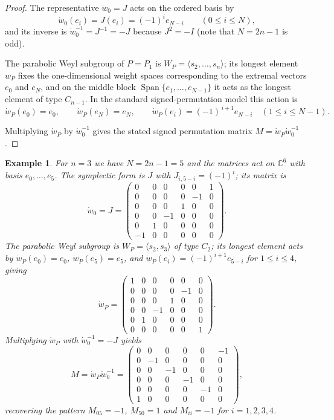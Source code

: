 \documentclass{article}
\newtheorem{exam}[thm]{Example}
\newcommand{\CC}{\mathbb{C}}
\begin{document}
\begin{proof}
The representative \(\dot w_0 = J\) acts on the ordered basis by
\[
\dot w_0(e_i)=J(e_i)=(-1)^i e_{N-i}\qquad(0\le i\le N),
\]
and its inverse is \(\dot w_0^{-1}=J^{-1}=-J\) because \(J^2=-I\) (note that \(N=2n-1\) is odd).

The parabolic Weyl subgroup of \(P=P_1\) is \(W_P=\langle s_2,\dots,s_n\rangle\); its longest element \(w_P\) fixes the one-dimensional weight spaces corresponding to the extremal vectors \(e_0\) and \(e_N\), and on the middle block \(\operatorname{Span}\{e_1,\dots,e_{N-1}\}\) it acts as the longest element of type \(C_{n-1}\).  In the standard signed-permutation model this action is
\[
\dot w_P(e_0)=e_0,\qquad
\dot w_P(e_N)=e_N,\qquad
\dot w_P(e_i)=(-1)^{\,i+1}e_{N-i}\quad(1\le i\le N-1).
\]

Multiplying \(\dot w_P\) by \(\dot w_0^{-1}\) gives the stated signed permutation matrix \(M=\dot w_P\dot w_0^{-1}\).
\end{proof}

\begin{exam}\label{ex:n3-matrices}
For \(n=3\) we have \(N=2n-1=5\) and the matrices act on \(\CC^6\) with basis \(e_0,\dots,e_5\).
The symplectic form is \(J\) with \(J_{i,5-i}=(-1)^i\); its matrix is
\[
\dot w_0 = J =
\begin{pmatrix}
 0& 0& 0& 0& 0& 1\\
 0& 0& 0& 0&-1& 0\\
 0& 0& 0& 1& 0& 0\\
 0& 0&-1& 0& 0& 0\\
 0& 1& 0& 0& 0& 0\\
-1& 0& 0& 0& 0& 0
\end{pmatrix}.
\]
The parabolic Weyl subgroup is \(W_P=\langle s_2,s_3\rangle\) of type \(C_2\); its longest element acts by \(\dot w_P(e_0)=e_0\), \(\dot w_P(e_5)=e_5\), and \(\dot w_P(e_i)=(-1)^{i+1}e_{5-i}\) for \(1\le i\le 4\), giving
\[
\dot w_P =
\begin{pmatrix}
1& 0& 0& 0& 0& 0\\
0& 0& 0& 0&-1& 0\\
0& 0& 0& 1& 0& 0\\
0& 0&-1& 0& 0& 0\\
0& 1& 0& 0& 0& 0\\
0& 0& 0& 0& 0& 1
\end{pmatrix}.
\]
Multiplying \(\dot w_P\) with \(\dot w_0^{-1}=-J\) yields
\[
M = \dot w_P\dot w_0^{-1} =
\begin{pmatrix}
 0& 0& 0& 0& 0&-1\\
 0&-1& 0& 0& 0& 0\\
 0& 0&-1& 0& 0& 0\\
 0& 0& 0&-1& 0& 0\\
 0& 0& 0& 0&-1& 0\\
 1& 0& 0& 0& 0& 0
\end{pmatrix},
\]
recovering the pattern \(M_{05}=-1\), \(M_{50}=1\) and \(M_{ii}=-1\) for \(i=1,2,3,4\).
\end{exam}
\end{document}
